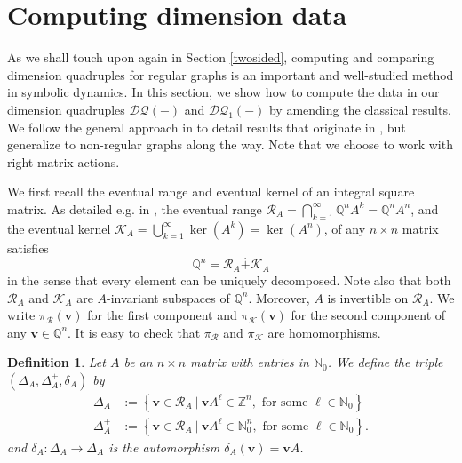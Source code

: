 \documentclass[12pt]{amsbook}%
\theoremstyle{defin}
\newtheorem{defin}[theor]{Definition}
\theoremstyle{remark}
\numberwithin{equation}{chapter}
\numberwithin{theor}{section}
\newcommand{\NN}{\mathbb{N}}
\newcommand{\QQ}{\mathbb{Q}}
\newcommand{\ZZ}{\mathbb{Z}}
\newcommand{\DQ}{\mathcal{DQ}}
\newcommand{\DQp}{\mathcal{DQ}_1}
\newcommand{\vv}{\mathbf{v}}
\newcommand{\pK}[1]{\pi_{\mathcal R}(#1)}
\newcommand{\piK}[1]{\pi_{\mathcal K}(#1)}
\begin{document}
\section{Computing dimension data}

As we shall touch upon again in Section \ref{twosided}, computing and comparing dimension quadruples for regular graphs is an important and well-studied method in symbolic dynamics. In this section, we show how to compute the data in our dimension quadruples $\DQ(-)$ and $\DQp(-)$ by amending the classical results. We  follow the general approach in \cite[Section~4.4]{rh:dlpa} to detail results that originate in \cite{wk:dftmc}, but generalize to non-regular graphs along the way.   Note that we choose to work with right matrix actions.   %



We first recall the eventual range and eventual kernel of an integral square matrix.  As detailed e.g. in  \cite[Remark~7.4.4 (2) and (3)]{dlbm:isdc}, the eventual range $\mathcal{R}_A = \bigcap_{k=1}^\infty \QQ^n A^k = \QQ^n A^n$, and the eventual kernel $\mathcal{K}_A = \bigcup_{ k = 1}^\infty \ker( A^k ) = \ker(A^n)$, of any $n\times n$ matrix satisfies
\[
\QQ^n = \mathcal{R}_A \overset{\mathbf{\cdot}}{+} \mathcal{K}_A
\]
in the sense that every element can be uniquely decomposed. Note also that both  $\mathcal{R}_A$ and  $\mathcal{K}_A$ are $A$-invariant subspaces of $\QQ^n$.   Moreover, $A$ is invertible on $\mathcal{R}_A$.  We write $\pK{\vv}$ for the first component and $\piK{\vv}$ for the second component of any $\vv\in\QQ^n$.  It is easy to check that $\pi_{\mathcal{R}}$ and $\pi_\mathcal{K}$ are homomorphisms.

\begin{defin}\label{kriegerpic}
Let $A$ be an $n \times n$ matrix with entries in $\NN_0$.  We define the triple $(\Delta_A, \Delta_A^+ , \delta_A)$ by
\begin{align*}
\Delta_A &:= \left\{ \vv \in    \mathcal{R}_A  \ | \  \vv A^\ell \in \ZZ^n, \text{ for some } \ell \in \NN_0 \right\}\\
\Delta_A^+ &:= \left\{ \vv \in  \mathcal{R}_A    \ | \ \vv A^\ell \in \NN_0^n, \text{ for some } \ell \in \NN_0 \right\}.
\end{align*}
and $\delta_A \colon \Delta_A \to \Delta_A$ is the automorphism $\delta_A( \vv) = \vv A$.  
\end{defin}
\end{document}
